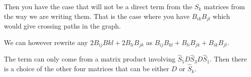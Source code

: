 \documentclass[english,master]{liumaiex}
\theoremstyle{plain}
\theoremstyle{definition}
\newcommand{\dotposition}[1]{
    ({-360/\n * (#1 - 1) + 90}:\radius)
}
\newcommand{\alllines}[1]{
    \foreach \i in {#1}{
        \foreach \j in {#1}{
            \ifnum\i<\j
            \draw[gray, very thick, loosely dashed] \dotposition{\i} -- \dotposition{\j};
            \fi
        }
    }
}
\begin{document}
\begin{center}
\end{center}

\begin{center}
\end{center}

Then you have the case that will not be a direct term from the $S_k$ matrices from the way we are writing them. That is the case where you have $B_{ik}B_{jl}$ which would give crossing paths in the graph.

We can however rewrite any $2B_{ij}B{kl} + 2B_{li}B_{jk}$ as $B_{ij}B_{kl} + B_{li}B_{jk} + B_{ik}B_{jl}$.

The term can only come from a matrix product involving $\hat{S}_5 D \hat{S}_3 D \hat{S}_1$. Then there is a choice of the other four matrices that can be either $D$ or $\hat{S}_k$.
\end{document}
